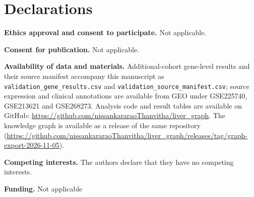 \documentclass[11pt,a4paper]{article}
\begin{document}

\section*{Declarations}
\textbf{Ethics approval and consent to participate.} Not applicable. 

\textbf{Consent for publication.} Not applicable.

\textbf{Availability of data and materials.} Additional-cohort gene-level results and their source manifest accompany this manuscript as \nolinkurl{validation_gene_results.csv} and \nolinkurl{validation_source_manifest.csv}; source expression and clinical annotations are available from GEO under GSE225740, GSE213621 and GSE268273. Analysis code and result tables are available on GitHub: \url{https://github.com/nissankararaoThanvitha/liver_graph}. The knowledge graph is available as a release of the same repository (\url{https://github.com/nissankararaoThanvitha/liver_graph/releases/tag/graph-export-2026-11-05}).

\textbf{Competing interests.} The authors declare that they have no competing interests.

\textbf{Funding.} Not applicable
\end{document}
